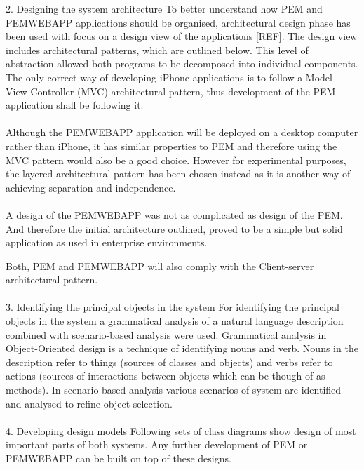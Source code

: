 \documentclass[12pt, a4paper]{report}   %
\begin{document}
\begin{enumerate}
2.	Designing the system architecture
To better understand how PEM and PEMWEBAPP applications should be organised, architectural design phase has been used with focus on a design view of the applications [REF]. The design view includes architectural patterns, which are outlined below. This level of abstraction allowed both programs to be decomposed into individual components. The only correct way of developing iPhone applications is to follow a Model-View-Controller (MVC) architectural pattern, thus development of the PEM application shall be following it.\\ \\


Although the PEMWEBAPP application will be deployed on a desktop computer rather than iPhone, it has similar properties to PEM and therefore using the MVC pattern would also be a good choice. However for experimental purposes, the layered architectural pattern has been chosen instead as it is another way of achieving separation and independence.\\ \\

 
A design of the PEMWEBAPP was not as complicated as design of the PEM. And therefore the initial architecture outlined, proved to be a simple but solid application as used in enterprise environments.
 

Both, PEM and PEMWEBAPP will also comply with the Client-server architectural pattern. \\ \\


3.	Identifying the principal objects in the system
For identifying the principal objects in the system a grammatical analysis of a natural language description combined with scenario-based analysis were used. Grammatical analysis in Object-Oriented design is a technique of identifying nouns and verb. Nouns in the description refer to things (sources of classes and objects) and verbs refer to actions (sources of interactions between objects which can be though of as methods). In scenario-based analysis various scenarios of system are identified and analysed to refine object selection.\\ \\

4.	Developing design models
Following sets of class diagrams show design of most important parts of both systems. Any further development of PEM or PEMWEBAPP can be built on top of these designs.\\ \\
 




\end{enumerate}
\end{document}
